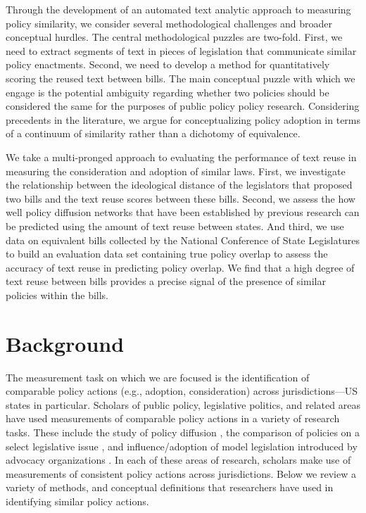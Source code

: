 \documentclass[12pt]{article} %
\begin{document}
Through the development of an automated text analytic approach to measuring policy similarity, we consider several methodological challenges and broader conceptual hurdles. The central methodological puzzles are two-fold. First, we need to extract segments of text in pieces of legislation that communicate similar policy enactments. Second, we need to develop a method for quantitatively scoring the reused text between bills. The main conceptual puzzle with which we engage is the potential ambiguity regarding whether two policies should be considered the same for the purposes of public policy policy research. Considering precedents in the literature, we argue for conceptualizing policy adoption in terms of a continuum of similarity rather than a dichotomy of equivalence.

We take a multi-pronged approach to evaluating the performance of text reuse in measuring the consideration and adoption of similar laws. First, we investigate the relationship between the ideological distance of the legislators that proposed two bills and the text reuse scores between these bills. Second, we assess the how well policy diffusion networks that have been established by previous research can be predicted using the amount of text reuse between states. And third, we use data on equivalent bills collected by the National Conference of State Legislatures to build an evaluation data set containing true policy overlap to assess the accuracy of text reuse in predicting policy overlap. We find that a high degree of text reuse between bills provides a precise signal of the presence of similar policies within the bills. 


\section{Background}

The measurement task on which we are focused is the identification of comparable policy actions (e.g., adoption, consideration) across jurisdictions---US states in particular. Scholars of public policy, legislative politics, and related areas have used measurements of comparable policy actions in a variety of research tasks. These include the study of policy diffusion \citep{karch2007emerging}, the comparison of policies on a select legislative issue \citep[e.g., ][]{huber2001legislatures,mycoff2009empirical}, and influence/adoption of model legislation introduced by advocacy organizations \citep[e.g., ][]{garrett2015,burgess2016legislative}. In each of these areas of research, scholars make use of measurements of consistent policy actions across jurisdictions. Below we review a variety of methods, and conceptual definitions that researchers have used in identifying similar policy actions.
\end{document}
